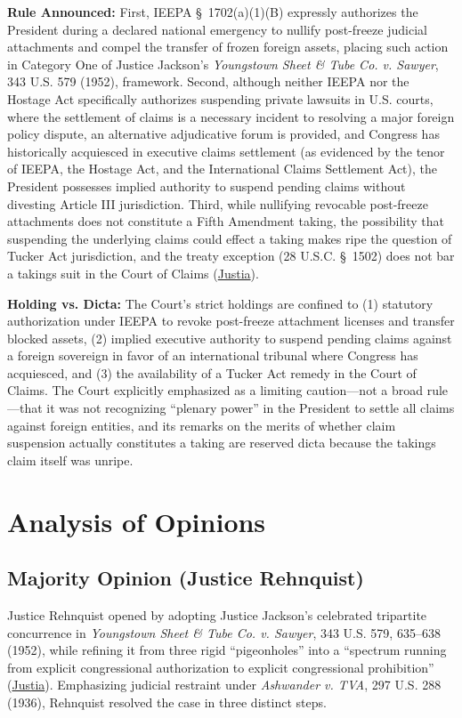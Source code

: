\documentclass[12pt]{article}
\begin{document}
\textbf{Rule Announced:} First, IEEPA \S\ 1702(a)(1)(B) expressly authorizes the President during a declared national emergency to nullify post-freeze judicial attachments and compel the transfer of frozen foreign assets, placing such action in Category One of Justice Jackson's \textit{Youngstown Sheet \& Tube Co. v. Sawyer}, 343 U.S. 579 (1952), framework. Second, although neither IEEPA nor the Hostage Act specifically authorizes suspending private lawsuits in U.S. courts, where the settlement of claims is a necessary incident to resolving a major foreign policy dispute, an alternative adjudicative forum is provided, and Congress has historically acquiesced in executive claims settlement (as evidenced by the tenor of IEEPA, the Hostage Act, and the International Claims Settlement Act), the President possesses implied authority to suspend pending claims without divesting Article III jurisdiction. Third, while nullifying revocable post-freeze attachments does not constitute a Fifth Amendment taking, the possibility that suspending the underlying claims could effect a taking makes ripe the question of Tucker Act jurisdiction, and the treaty exception (28 U.S.C. \S\ 1502) does not bar a takings suit in the Court of Claims (\href{https://supreme.justia.com/cases/federal/us/453/654/}{Justia}).

\textbf{Holding vs. Dicta:} The Court's strict holdings are confined to (1) statutory authorization under IEEPA to revoke post-freeze attachment licenses and transfer blocked assets, (2) implied executive authority to suspend pending claims against a foreign sovereign in favor of an international tribunal where Congress has acquiesced, and (3) the availability of a Tucker Act remedy in the Court of Claims. The Court explicitly emphasized as a limiting caution---not a broad rule---that it was not recognizing ``plenary power'' in the President to settle all claims against foreign entities, and its remarks on the merits of whether claim suspension actually constitutes a taking are reserved dicta because the takings claim itself was unripe.

\section{Analysis of Opinions}

\subsection{Majority Opinion (Justice Rehnquist)}
Justice Rehnquist opened by adopting Justice Jackson's celebrated tripartite concurrence in \textit{Youngstown Sheet \& Tube Co. v. Sawyer}, 343 U.S. 579, 635--638 (1952), while refining it from three rigid ``pigeonholes'' into a ``spectrum running from explicit congressional authorization to explicit congressional prohibition'' (\href{https://supreme.justia.com/cases/federal/us/453/654/}{Justia}). Emphasizing judicial restraint under \textit{Ashwander v. TVA}, 297 U.S. 288 (1936), Rehnquist resolved the case in three distinct steps.
\end{document}
